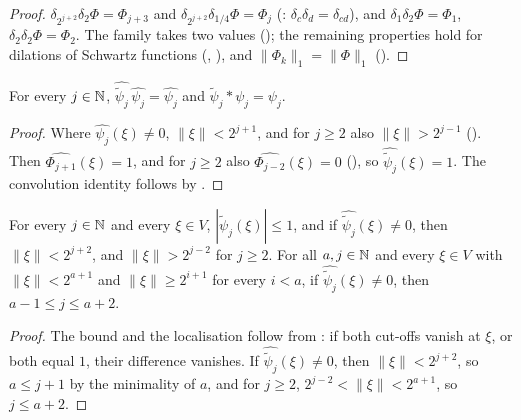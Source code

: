 \begin{proof}
\leanok
$\delta_{2^{j+2}} \delta_2 \Phi = \Phi_{j+3}$ and $\delta_{2^{j+2}} \delta_{1/4} \Phi = \Phi_j$
(: $\delta_c \delta_d = \delta_{cd}$), and $\delta_1 \delta_2 \Phi =
\Phi_1$, $\delta_2 \delta_2 \Phi = \Phi_2$. The family takes
two values (); the remaining properties hold for dilations
of Schwartz functions (, ), and
$\|\Phi_k\|_1 = \|\Phi\|_1$ ().
\end{proof}

\begin{lemma}
\label{lem:psi-dual-reproduces}
\leanok
{}
For every $j \in \mathbb{N}$, $\widehat{\tilde\psi_j} \, \widehat{\psi_j} = \widehat{\psi_j}$ and
$\tilde\psi_j * \psi_j = \psi_j$.
\end{lemma}

\begin{proof}
\leanok
Where $\widehat{\psi_j}(\xi) \neq 0$, $\|\xi\| < 2^{j+1}$, and for $j \geq 2$ also
$\|\xi\| > 2^{j-1}$ (). Then $\widehat{\Phi_{j+1}}(\xi) = 1$,
and for $j \geq 2$ also $\widehat{\Phi_{j-2}}(\xi) = 0$ (), so
$\widehat{\tilde\psi_j}(\xi) = 1$. The convolution identity follows by .
\end{proof}

\begin{lemma}
\label{lem:psi-dual-frequency}
\leanok
{}
For every $j \in \mathbb{N}$ and every $\xi \in V$, $|\widehat{\tilde\psi_j}(\xi)| \leq 1$, and if
$\widehat{\tilde\psi_j}(\xi) \neq 0$, then $\|\xi\| < 2^{j+2}$, and $\|\xi\| > 2^{j-2}$ for
$j \geq 2$. For all $a, j \in \mathbb{N}$ and every $\xi \in V$ with $\|\xi\| < 2^{a+1}$ and
$\|\xi\| \geq 2^{i+1}$ for every $i < a$, if $\widehat{\tilde\psi_j}(\xi) \neq 0$, then
$a - 1 \leq j \leq a + 2$.
\end{lemma}

\begin{proof}
\leanok
The bound and the localisation follow from : if both cut-offs
vanish at $\xi$, or both equal $1$, their difference vanishes. If
$\widehat{\tilde\psi_j}(\xi) \neq 0$, then $\|\xi\| < 2^{j+2}$, so $a \leq j + 1$ by the
minimality of $a$, and for $j \geq 2$, $2^{j-2} < \|\xi\| < 2^{a+1}$, so $j \leq a + 2$.
\end{proof}

